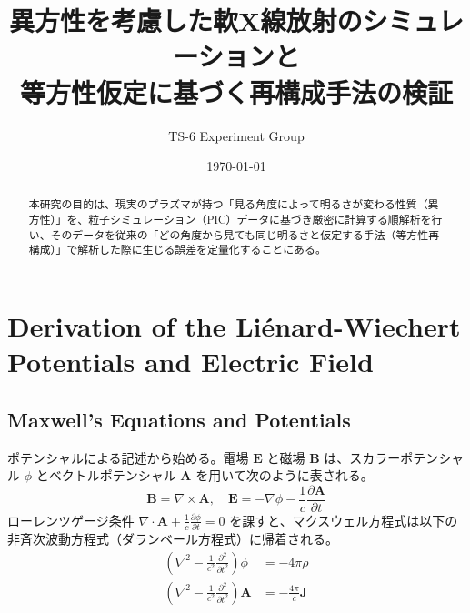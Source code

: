 \documentclass[a4paper,11pt]{bxjsarticle} %
\title{異方性を考慮した軟X線放射のシミュレーションと\\等方性仮定に基づく再構成手法の検証}
\author{TS-6 Experiment Group}
\date{\today}
\begin{document}
\maketitle

\begin{abstract}
本研究の目的は、現実のプラズマが持つ「見る角度によって明るさが変わる性質（異方性）」を、粒子シミュレーション（PIC）データに基づき厳密に計算する順解析を行い、そのデータを従来の「どの角度から見ても同じ明るさと仮定する手法（等方性再構成）」で解析した際に生じる誤差を定量化することにある。
\end{abstract}



\section{Derivation of the Liénard-Wiechert Potentials and Electric Field}
\subsection{Maxwell's Equations and Potentials}
ポテンシャルによる記述から始める。電場 $\mathbf{E}$ と磁場 $\mathbf{B}$ は、スカラーポテンシャル $\phi$ とベクトルポテンシャル $\mathbf{A}$ を用いて次のように表される。
\begin{equation}
    \mathbf{B} = \nabla \times \mathbf{A}, \quad \mathbf{E} = -\nabla \phi - \frac{1}{c} \frac{\partial \mathbf{A}}{\partial t}
\end{equation}
ローレンツゲージ条件 $\nabla \cdot \mathbf{A} + \frac{1}{c}\frac{\partial \phi}{\partial t} = 0$ を課すと、マクスウェル方程式は以下の非斉次波動方程式（ダランベール方程式）に帰着される。
\begin{align}
    (\nabla^2 - \frac{1}{c^2}\frac{\partial^2}{\partial t^2})\phi &= -4\pi \rho \\
    (\nabla^2 - \frac{1}{c^2}\frac{\partial^2}{\partial t^2}) \mathbf{A} &= -\frac{4\pi}{c} \mathbf{J}
\end{align}
\end{document}

